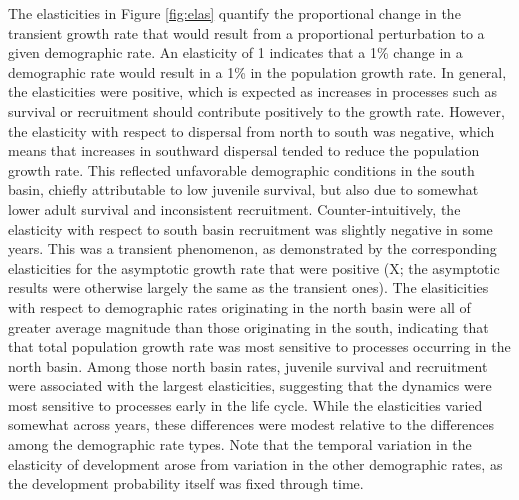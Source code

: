 The elasticities in Figure \ref{fig:elas} quantify the proportional change in the transient
growth rate that would result from a proportional perturbation to a given demographic 
rate.
An elasticity of 1 indicates that a 1\% change in a demographic rate would result in
a 1\% in the population growth rate.
In general, the elasticities were positive,
which is expected as increases in processes such as survival or recruitment
should contribute positively to the growth rate.
However, the elasticity with respect to dispersal from north to south was negative,
which means that increases in southward dispersal 
tended to reduce the population growth rate.
This reflected unfavorable demographic conditions in the south basin,
chiefly attributable to low juvenile survival,
but also due to somewhat lower adult survival and inconsistent recruitment.
Counter-intuitively, the elasticity with respect to south basin recruitment was
slightly negative in some years. 
This was a transient phenomenon,
as demonstrated by the corresponding elasticities 
for the asymptotic growth rate that were positive
(X; the asymptotic results were otherwise largely the same as the transient ones).
The elasiticities with respect to 
demographic rates originating in the north basin were all of greater
average magnitude than those originating in the south,
indicating that that total population growth rate was most sensitive to processes
occurring in the north basin.
Among those north basin rates, juvenile survival and recruitment were associated with
the largest elasticities,
suggesting that the dynamics were most sensitive to processes early in the life cycle.
While the elasticities varied somewhat across years, 
these differences were modest relative to the differences among the demographic rate types.
Note that the temporal variation in the elasticity of development arose from
variation in the other demographic rates, 
as the development probability itself was fixed through time.









